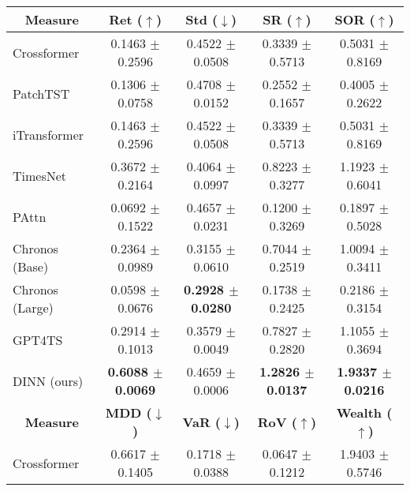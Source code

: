 \centering
{\fontsize{8pt}{11pt}\selectfont
\begin{tabular}{lcccc}
\hline
\multicolumn{1}{c}{\textbf{Measure}} & \textbf{Ret ($\uparrow$)}   & \textbf{Std ($\downarrow$)} & \textbf{SR ($\uparrow$)}  & \textbf{SOR ($\uparrow$)}    \\ \hline
Crossformer                          & 0.1463 $\pm$ 0.2596         & 0.4522 $\pm$ 0.0508         & 0.3339 $\pm$ 0.5713       & 0.5031 $\pm$ 0.8169          \\
PatchTST                             & 0.1306 $\pm$ 0.0758         & 0.4708 $\pm$ 0.0152         & 0.2552 $\pm$ 0.1657       & 0.4005 $\pm$ 0.2622          \\
iTransformer                         & 0.1463 $\pm$ 0.2596         & 0.4522 $\pm$ 0.0508         & 0.3339 $\pm$ 0.5713       & 0.5031 $\pm$ 0.8169          \\
TimesNet                             & 0.3672 $\pm$ 0.2164         & 0.4064 $\pm$ 0.0997         & 0.8223 $\pm$ 0.3277       & 1.1923 $\pm$ 0.6041          \\
PAttn                                & 0.0692 $\pm$ 0.1522         & 0.4657 $\pm$ 0.0231         & 0.1200 $\pm$ 0.3269       & 0.1897 $\pm$ 0.5028          \\
Chronos (Base)                       & 0.2364 $\pm$ 0.0989         & 0.3155 $\pm$ 0.0610         & 0.7044 $\pm$ 0.2519       & 1.0094 $\pm$ 0.3411          \\
Chronos (Large)                      & 0.0598 $\pm$ 0.0676         & \textbf{0.2928 $\pm$ 0.0280}         & 0.1738 $\pm$ 0.2425       & 0.2186 $\pm$ 0.3154          \\
GPT4TS                               & 0.2914 $\pm$ 0.1013         & 0.3579 $\pm$ 0.0049         & 0.7827 $\pm$ 0.2820       & 1.1055 $\pm$ 0.3694          \\
DINN (ours)                          & \textbf{0.6088 $\pm$ \color[HTML]{00009B} 0.0069}         & 0.4659 $\pm$ \color[HTML]{00009B} 0.0006         & \textbf{1.2826 $\pm$ \color[HTML]{00009B} 0.0137}       & \textbf{1.9337 $\pm$ \color[HTML]{00009B} 0.0216}         \\ \hline
\multicolumn{1}{c}{\textbf{Measure}} & \textbf{MDD ($\downarrow$)} & \textbf{VaR ($\downarrow$)} & \textbf{RoV ($\uparrow$)} & \textbf{Wealth ($\uparrow$)} \\ \hline
Crossformer                          & 0.6617 $\pm$ 0.1405         & 0.1718 $\pm$ 0.0388         & 0.0647 $\pm$ 0.1212       & 1.9403 $\pm$ 0.5746          \\

\end{tabular}}
